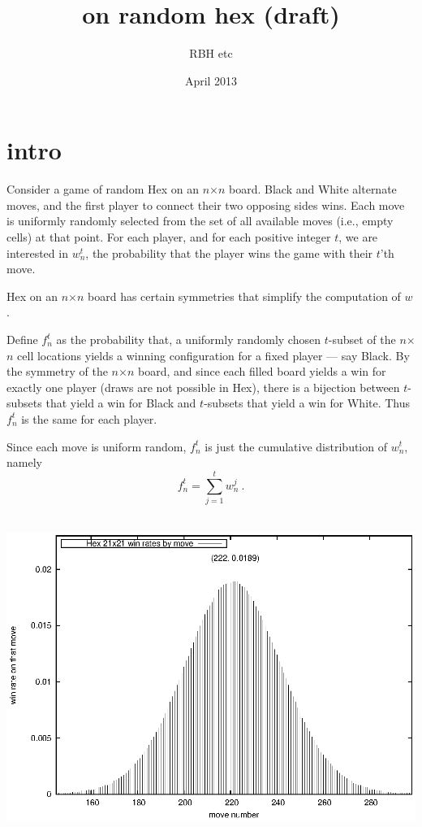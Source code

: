 \documentclass[12pt]{article}
\title{on random hex (draft)}
\author{RBH etc}
\date{April 2013}
\begin{document}
\maketitle
\section{intro}
Consider a game of random Hex on an $n$$\times$$n$ board.
Black and White alternate moves, and the first player to connect their two opposing sides wins. Each move is uniformly randomly selected
from the set of all available moves (i.e., empty cells) at that point.
For each player, and for each positive integer $t$,
we are interested in $w_n^t$, the probability that the player wins the game with their $t$'th move.

Hex on an $n$$\times$$n$ board has certain symmetries that simplify the computation of $w$.

Define $f_n^t$ as the probability that, 
a uniformly randomly chosen
$t$-subset of the $n$$\times$$n$ cell locations yields a winning configuration
for a fixed player --- say Black.
By the symmetry of the $n$$\times$$n$ board, and since 
each filled board yields a win for exactly one player (draws are not possible in Hex),
there is a bijection between $t$-subsets that
yield a win for Black and $t$-subsets that yield a win for White.
Thus $f_n^t$ is the same for each player.

Since each move is uniform random, 
$f_n^t$ is just the cumulative distribution of $w_n^t$,
namely
\[ f_n^t = \sum_{j=1}^t w_n^j \: .  \]


%
\ \hfill \includegraphics{code/data/gn/winrate.21.eps} \hfill \ 
\end{document}
